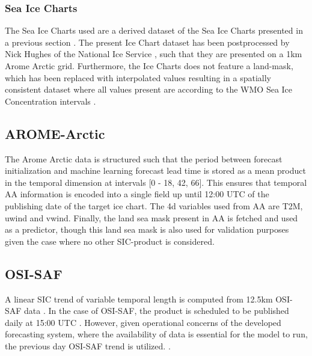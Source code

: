 \documentclass[../main/thesis.tex]{subfiles}
\begin{document}
\subsubsection{Sea Ice Charts}
The Sea Ice Charts used are a derived dataset of the Sea Ice Charts presented in a previous section . The present Ice Chart dataset has been postprocessed by Nick Hughes of the National Ice Service , such that they are presented on a 1km Arome Arctic grid. Furthermore, the Ice Charts does not feature a land-mask, which has been replaced with interpolated values resulting in a spatially consistent dataset where all values present are according to the WMO Sea Ice Concentration intervals \cite{JETSI2014}. 

\subsection{AROME-Arctic}
The Arome Arctic data is structured such that the period between forecast initialization and machine learning forecast lead time is stored as a mean product in the temporal dimension at intervals [0 - 18, 42, 66]. This ensures that temporal AA information is encoded into a single field up until 12:00 UTC of the publishing date of the target ice chart. The 4d variables used from AA are T2M, uwind and vwind. Finally, the land sea mask present in AA is fetched and used as a predictor, though this land sea mask is also used for validation purposes given the case where no other SIC-product is considered.

\subsection{OSI-SAF}
A linear SIC trend of variable temporal length is computed from 12.5km OSI-SAF data . In the case of OSI-SAF, the product is scheduled to be published daily at 15:00 UTC . However, given operational concerns of the developed forecasting system, where the availability of data is essential for the model to run, the previous day OSI-SAF trend is utilized. .



\biblio
\end{document}
